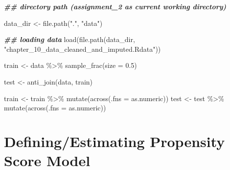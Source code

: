 \documentclass[
]{article}
\newenvironment{Shaded}{\begin{snugshade}}{\end{snugshade}}
\newcommand{\AttributeTok}[1]{\textcolor[rgb]{0.77,0.63,0.00}{#1}}
\newcommand{\DocumentationTok}[1]{\textcolor[rgb]{0.56,0.35,0.01}{\textbf{\textit{#1}}}}
\newcommand{\FloatTok}[1]{\textcolor[rgb]{0.00,0.00,0.81}{#1}}
\newcommand{\FunctionTok}[1]{\textcolor[rgb]{0.00,0.00,0.00}{#1}}
\newcommand{\NormalTok}[1]{#1}
\newcommand{\OtherTok}[1]{\textcolor[rgb]{0.56,0.35,0.01}{#1}}
\newcommand{\SpecialCharTok}[1]{\textcolor[rgb]{0.00,0.00,0.00}{#1}}
\newcommand{\StringTok}[1]{\textcolor[rgb]{0.31,0.60,0.02}{#1}}
\begin{document}
\begin{Shaded}
\begin{Highlighting}[]
\DocumentationTok{\#\# directory path (assignment\_2 as current working directory)}

\NormalTok{data\_dir }\OtherTok{\textless{}{-}} \FunctionTok{file.path}\NormalTok{(}\StringTok{"."}\NormalTok{, }\StringTok{"data"}\NormalTok{)}

\DocumentationTok{\#\# loading data}
\FunctionTok{load}\NormalTok{(}\FunctionTok{file.path}\NormalTok{(data\_dir, }\StringTok{"chapter\_10\_data\_cleaned\_and\_imputed.Rdata"}\NormalTok{))}

\NormalTok{train }\OtherTok{\textless{}{-}}\NormalTok{ data }\SpecialCharTok{\%\textgreater{}\%} 
  \FunctionTok{sample\_frac}\NormalTok{(}\AttributeTok{size =} \FloatTok{0.5}\NormalTok{)}

\NormalTok{test }\OtherTok{\textless{}{-}} \FunctionTok{anti\_join}\NormalTok{(data, train)}

\NormalTok{train }\OtherTok{\textless{}{-}}\NormalTok{ train }\SpecialCharTok{\%\textgreater{}\%} \FunctionTok{mutate}\NormalTok{(}\FunctionTok{across}\NormalTok{(}\AttributeTok{.fns =}\NormalTok{ as.numeric))    }
\NormalTok{test }\OtherTok{\textless{}{-}}\NormalTok{ test }\SpecialCharTok{\%\textgreater{}\%} \FunctionTok{mutate}\NormalTok{(}\FunctionTok{across}\NormalTok{(}\AttributeTok{.fns =}\NormalTok{ as.numeric))    }
\end{Highlighting}
\end{Shaded}

\hypertarget{definingestimating-propensity-score-model}{%
\section{Defining/Estimating Propensity Score
Model}\label{definingestimating-propensity-score-model}}
\end{document}
